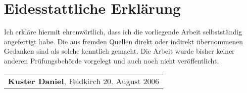 
\chapter*{Eidesstattliche Erkl\"arung}

Ich erkl\"are hiermit ehrenw\"ortlich, dass ich die vorliegende Arbeit selbstst\"andig angefertigt habe. Die aus fremden Quellen direkt oder indirekt \"ubernommenen Gedanken sind als solche kenntlich gemacht. Die Arbeit wurde bisher keiner anderen Pr\"ufungsbeh\"orde vorgelegt und auch noch nicht ver\"offentlicht. \vspace{3cm}


\begin{table}[htbp]
	\begin{center}
		\begin{tabular}{p{250pt}}
		\hline
			\vspace{0ex}
			\centerline{{\bf{Kuster Daniel}}, Feldkirch 20. August 2006}
		\end{tabular}
	\end{center}
\end{table}
